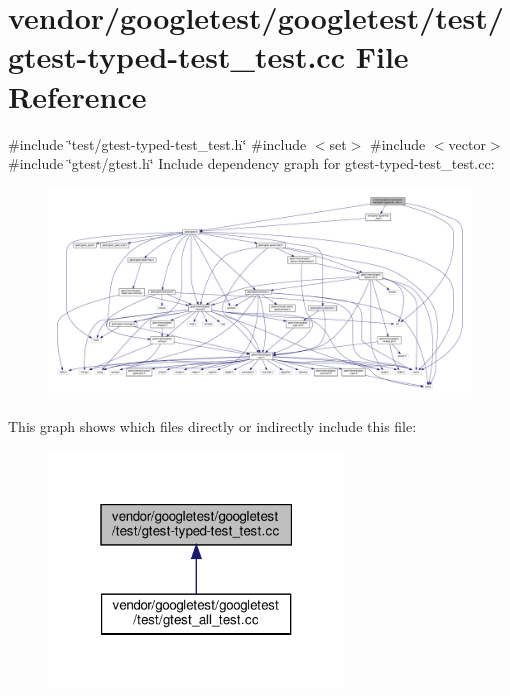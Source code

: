 \hypertarget{gtest-typed-test__test_8cc}{}\section{vendor/googletest/googletest/test/gtest-\/typed-\/test\+\_\+test.cc File Reference}
\label{gtest-typed-test__test_8cc}
{\ttfamily \#include \char`\"{}test/gtest-\/typed-\/test\+\_\+test.\+h\char`\"{}}\newline
{\ttfamily \#include $<$set$>$}\newline
{\ttfamily \#include $<$vector$>$}\newline
{\ttfamily \#include \char`\"{}gtest/gtest.\+h\char`\"{}}\newline
Include dependency graph for gtest-\/typed-\/test\+\_\+test.cc\+:
\nopagebreak
\begin{figure}[H]
\begin{center}
\leavevmode
\includegraphics[width=350pt]{gtest-typed-test__test_8cc__incl}
\end{center}
\end{figure}
This graph shows which files directly or indirectly include this file\+:
\nopagebreak
\begin{figure}[H]
\begin{center}
\leavevmode
\includegraphics[width=223pt]{gtest-typed-test__test_8cc__dep__incl}
\end{center}
\end{figure}
